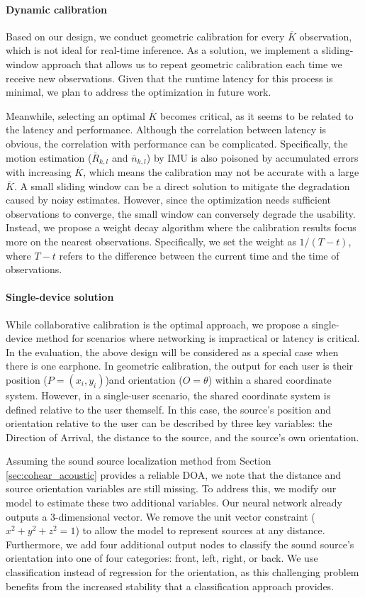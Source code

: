 \paragraph{Dynamic calibration}
Based on our design, we conduct geometric calibration for every \(\overline{K}\) observation, which is not ideal for real-time inference. As a solution, we implement a sliding-window approach that allows us to repeat geometric calibration each time we receive new observations. Given that the runtime latency for this process is minimal, we plan to address the optimization in future work.

Meanwhile, selecting an optimal \(\overline{K}\) becomes critical, as it seems to be related to the latency and performance. Although the correlation between latency is obvious, the correlation with performance can be complicated. Specifically, the motion estimation (\(\overline{R}_{k,l}\) and \(\overline{n}_{k,l}\)) by IMU is also poisoned by accumulated errors with increasing \(\overline{K}\), which means the calibration may not be accurate with a large \(\overline{K}\). A small sliding window can be a direct solution to mitigate the degradation caused by noisy estimates. However, since the optimization needs sufficient observations to converge, the small window can conversely degrade the usability. Instead, we propose a weight decay algorithm where the calibration results focus more on the nearest observations. Specifically, we set the weight as \(  1/ (T-t)\), where \(T-t\) refers to the difference between the current time and the time of observations.

\paragraph{Single-device solution}
While collaborative calibration is the optimal approach, we propose a single-device method for scenarios where networking is impractical or latency is critical. In the evaluation, the above design will be considered as a special case when there is one earphone.
In geometric calibration, the output for each user is their position (\(P=(x_i, y_i)\))and orientation (\(O=\theta\)) within a shared coordinate system. However, in a single-user scenario, the shared coordinate system is defined relative to the user themself. In this case, the source's position and orientation relative to the user can be described by three key variables: the Direction of Arrival, the distance to the source, and the source's own orientation.

Assuming the sound source localization method from Section \ref{sec:cohear_acoustic} provides a reliable DOA, we note that the distance and source orientation variables are still missing. To address this, we modify our model to estimate these two additional variables.
Our neural network already outputs a 3-dimensional vector. We remove the unit vector constraint (\(x^2+y^2+z^2=1\)) to allow the model to represent sources at any distance. Furthermore, we add four additional output nodes to classify the sound source's orientation into one of four categories: front, left, right, or back. We use classification instead of regression for the orientation, as this challenging problem benefits from the increased stability that a classification approach provides.

